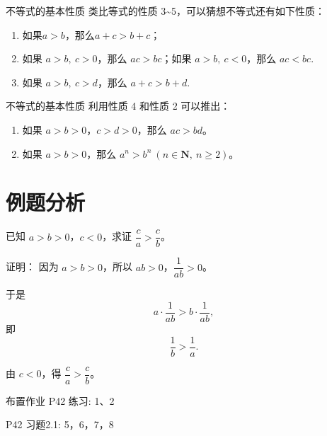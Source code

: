 \documentclass[12pt,aspectratio=169,t,fleqn]{beamer}
\begin{document}
\begin{frame}{不等式的基本性质}
类比等式的性质 3\textasciitilde 5，可以猜想不等式还有如下性质：
	\begin{enumerate}[<+->]\addtocounter{enumi}{2}
		
	\item  如果$a>b$，那么$a+c>b+c$；	
	\item 如果 $a>b,\ c>0$，那么 $ac>bc$；如果 $a>b,\ c<0$，那么 $ac<bc$.
	
	\item  如果 $a>b,\ c>d$，那么 $a+c>b+d$.

	\end{enumerate}
\end{frame}

\begin{frame}{不等式的基本性质}
	利用性质 4 和性质 2 可以推出：
	\begin{enumerate}[<+->]\addtocounter{enumi}{5}
		
		\item 如果 $a>b>0$，$c>d>0$，那么 $ac>bd$。
		
		\item 如果 $a>b>0$，那么 $a^n>b^n\ (n\in\mathbf{N},\ n\ge 2)$。
	\end{enumerate}
\end{frame}

\section{例题分析}
\begin{frame}{}
	\begin{example}
		已知 $a>b>0$，$c<0$，求证 $\dfrac{c}{a}>\dfrac{c}{b}$。
	\end{example}
	
	\pause

	证明：	因为 $a>b>0$，所以 $ab>0$，$\dfrac{1}{ab}>0$。
		
		于是
		\[
		a\cdot \frac{1}{ab}>b\cdot \frac{1}{ab},
		\]
		即
		\[
		\frac{1}{b}>\frac{1}{a}.
		\]
		
		由 $c<0$，得 $\dfrac{c}{a}>\dfrac{c}{b}$。

\end{frame}
\begin{frame}{布置作业}
	P42 练习: 1、2
	
	P42 习题2.1: 5，6，7，8	
\end{frame}
\end{document}
